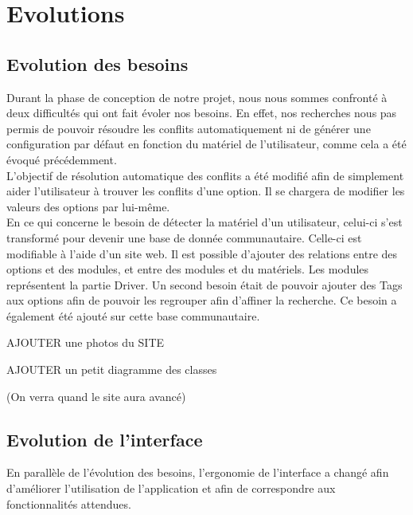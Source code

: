\documentclass[16pts]{report}
\begin{document}

\nocite{*}

\chapter{Evolutions}
\label{cha:Evolutions}

\section{Evolution des besoins}
\label{sec:Evolution des besoins}

Durant la phase de conception de notre projet, nous nous sommes confronté à 
deux difficultés qui ont fait évoler nos besoins. En effet, nos recherches 
nous pas permis de pouvoir résoudre les conflits automatiquement ni de générer 
une configuration par défaut en fonction du matériel de l'utilisateur, comme
cela a été évoqué précédemment. 
\\
L'objectif de résolution automatique des conflits a été modifié afin de 
simplement aider l'utilisateur à trouver les conflits d'une option. Il se 
chargera de modifier les valeurs des options par lui-même.
\\
En ce qui concerne le besoin de détecter la matériel d'un utilisateur, celui-ci 
s'est transformé pour devenir une base de donnée communautaire. Celle-ci est 
modifiable à l'aide d'un site web. Il est possible d'ajouter des relations 
entre des options et des modules, et entre des modules et du matériels. Les 
modules représentent la partie Driver. Un second besoin était de pouvoir 
ajouter des Tags aux options afin de pouvoir les regrouper afin d'affiner la 
recherche. Ce besoin a également été ajouté sur cette base communautaire.

AJOUTER une photos du SITE

AJOUTER un petit diagramme des classes

(On verra quand le site aura avancé)

\section{Evolution de l'interface}
\label{sec:Evolution de l'interface}

En parallèle de l'évolution des besoins, l'ergonomie de l'interface a changé 
afin d'améliorer l'utilisation de l'application et afin de correspondre aux 
fonctionnalités attendues.
\end{document}
